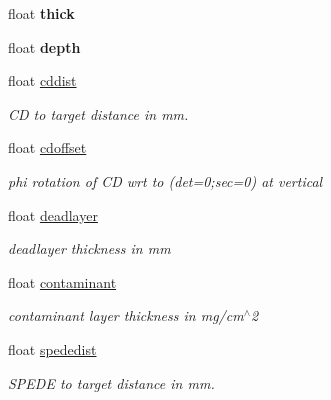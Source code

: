 \begin{DoxyCompactItemize}
float {\bfseries thick}
\item 
\mbox{\label{classg__clx_a55b2ad47323975fbefd70314a1580d26}} 
float {\bfseries depth}
\item 
\mbox{\label{classg__clx_af6483d6ed4f21d91fe1ac7e88393ab4e}} 
float \hyperlink{classg__clx_af6483d6ed4f21d91fe1ac7e88393ab4e}{cddist}
\begin{DoxyCompactList}\small\item\em CD to target distance in mm. \end{DoxyCompactList}\item 
\mbox{\label{classg__clx_a2f16d48f2601cfd6ccb100283f3cdab7}} 
float \hyperlink{classg__clx_a2f16d48f2601cfd6ccb100283f3cdab7}{cdoffset}
\begin{DoxyCompactList}\small\item\em phi rotation of CD wrt to (det=0;sec=0) at vertical \end{DoxyCompactList}\item 
\mbox{\label{classg__clx_a9868b722188e951233b134083dd63370}} 
float \hyperlink{classg__clx_a9868b722188e951233b134083dd63370}{deadlayer}
\begin{DoxyCompactList}\small\item\em deadlayer thickness in mm \end{DoxyCompactList}\item 
\mbox{\label{classg__clx_a9093a10412ab047b3b910e4c4a9d70d1}} 
float \hyperlink{classg__clx_a9093a10412ab047b3b910e4c4a9d70d1}{contaminant}
\begin{DoxyCompactList}\small\item\em contaminant layer thickness in mg/cm$^\wedge$2 \end{DoxyCompactList}\item 
\mbox{\label{classg__clx_aca4cd80422665dab4188cbf82bb569ce}} 
float \hyperlink{classg__clx_aca4cd80422665dab4188cbf82bb569ce}{spededist}
\begin{DoxyCompactList}\small\item\em S\+P\+E\+DE to target distance in mm. \end{DoxyCompactList}\item 
\mbox{\label{classg__clx_ad9d34b2f15cdb59de8b46f1f68280c5c}} 

\end{DoxyCompactItemize}
